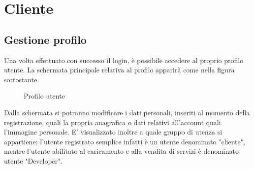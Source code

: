 \newpage
\section{Cliente}

\subsection{Gestione profilo}

Una volta effettuato con successo il login, è possibile accedere al proprio profilo utente. La schermata principale relativa al profilo apparirà come nella figura sottostante.

\label{Profilo utente}
\begin{figure}[H]
	\centering
	\caption{Profilo utente}
\end{figure}

Dalla schermata si potranno modificare i dati personali, inseriti al momento della registrazione, quali la propria anagrafica o dati relativi all'account quali l'immagine personale. E' visualizzato inoltre a quale gruppo di utenza si appartiene: l'utente registrato semplice infatti è un utente denominato "cliente", mentre l'utente abilitato al caricamento e alla vendita di servizi è denominato utente "Developer".

